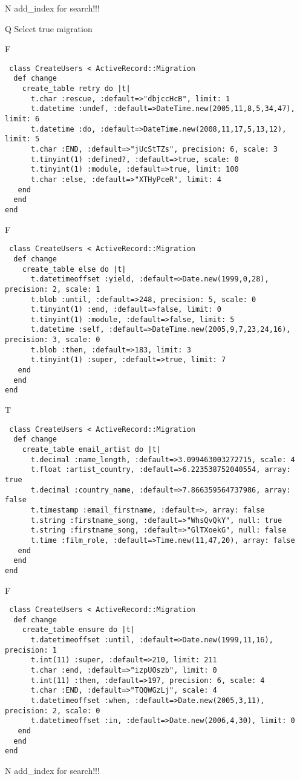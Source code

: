 N
add_index for search!!!
  
Q
Select true migration

F
\begin{verbatim}
 class CreateUsers < ActiveRecord::Migration 
  def change 
    create_table retry do |t| 
      t.char :rescue, :default=>"dbjccHcB", limit: 1
      t.datetime :undef, :default=>DateTime.new(2005,11,8,5,34,47), limit: 6
      t.datetime :do, :default=>DateTime.new(2008,11,17,5,13,12), limit: 5
      t.char :END, :default=>"jUcStTZs", precision: 6, scale: 3
      t.tinyint(1) :defined?, :default=>true, scale: 0
      t.tinyint(1) :module, :default=>true, limit: 100
      t.char :else, :default=>"XTHyPceR", limit: 4
   end 
  end 
end
\end{verbatim}

F
\begin{verbatim}
 class CreateUsers < ActiveRecord::Migration 
  def change 
    create_table else do |t| 
      t.datetimeoffset :yield, :default=>Date.new(1999,0,28), precision: 2, scale: 1
      t.blob :until, :default=>248, precision: 5, scale: 0
      t.tinyint(1) :end, :default=>false, limit: 0
      t.tinyint(1) :module, :default=>false, limit: 5
      t.datetime :self, :default=>DateTime.new(2005,9,7,23,24,16), precision: 3, scale: 0
      t.blob :then, :default=>183, limit: 3
      t.tinyint(1) :super, :default=>true, limit: 7
   end 
  end 
end
\end{verbatim}

T
\begin{verbatim}
 class CreateUsers < ActiveRecord::Migration 
  def change 
    create_table email_artist do |t| 
      t.decimal :name_length, :default=>3.099463003272715, scale: 4
      t.float :artist_country, :default=>6.223538752040554, array: true
      t.decimal :country_name, :default=>7.866359564737986, array: false
      t.timestamp :email_firstname, :default=>, array: false
      t.string :firstname_song, :default=>"WhsQvQkY", null: true
      t.string :firstname_song, :default=>"GlTXoekG", null: false
      t.time :film_role, :default=>Time.new(11,47,20), array: false
   end 
  end 
end
\end{verbatim}

F
\begin{verbatim}
 class CreateUsers < ActiveRecord::Migration 
  def change 
    create_table ensure do |t| 
      t.datetimeoffset :until, :default=>Date.new(1999,11,16), precision: 1
      t.int(11) :super, :default=>210, limit: 211
      t.char :end, :default=>"izpUOszb", limit: 0
      t.int(11) :then, :default=>197, precision: 6, scale: 4
      t.char :END, :default=>"TQQWGzLj", scale: 4
      t.datetimeoffset :when, :default=>Date.new(2005,3,11), precision: 2, scale: 0
      t.datetimeoffset :in, :default=>Date.new(2006,4,30), limit: 0
   end 
  end 
end
\end{verbatim}
N
add_index for search!!!
  
